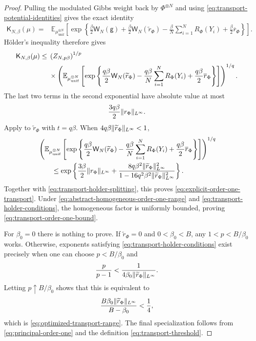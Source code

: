 \documentclass[11pt,reqno]{amsart}
\numberwithin{equation}{section}
\theoremstyle{plain}
\theoremstyle{definition}
\DeclarePairedDelimiter{\norm}{\lVert}{\rVert}
\newcommand{\E}{\mathbb E}
\newcommand{\be}{\beta}
\newcommand{\g}{\mathsf g}
\newcommand{\K}{\mathsf K}
\newcommand{\tl}{\widetilde}
\newcommand{\muunif}{\mu_{\mathrm{unif}}}
\begin{document}
\begin{proof}
Pulling the modulated Gibbs weight back by $\Phi^{\otimes N}$ and using \eqref{eq:transport-potential-identities} gives the exact identity
\begin{align}
 \K_{N,\be}(\mu)
 ={}&\E_{\muunif^{\otimes N}}\left[
 \exp\left\{\frac\be2\mathsf W_N(\g)
 +\frac\be2\mathsf W_N(\tl r_{\Phi})
 -\frac\be N\sum_{i=1}^NR_{\Phi}(Y_i)
 +\frac\be2\overline r_{\Phi}\right\}\right].
 \label{eq:transport-pullback-identity}
\end{align}
H\"older's inequality therefore gives
\begin{align}
 \K_{N,\be}(\mu)
 \leq{}&\left(Z_{N,p\be}\right)^{1/p}
 \notag\\
 &\times\left(\E_{\muunif^{\otimes N}}\left[
 \exp\left\{\frac{q\be}{2}\mathsf W_N(\tl r_{\Phi})
 -\frac{q\be}{N}\sum_{i=1}^NR_{\Phi}(Y_i)
 +\frac{q\be}{2}\overline r_{\Phi}\right\}\right]\right)^{1/q}.
 \label{eq:transport-holder-splitting}
\end{align}
The last two terms in the second exponential have absolute value at most
\begin{equation}
 \frac{3q\be}{2}\norm{r_{\Phi}}_{L^\infty}.
 \label{eq:transport-one-body-absolute-bound}
\end{equation}
Apply  to $\tl r_{\Phi}$ with $t=q\be$.  When $4q\be\norm{\tl r_{\Phi}}_{L^\infty}<1$,
\begin{align}
 &\left(\E_{\muunif^{\otimes N}}\left[
 \exp\left\{\frac{q\be}{2}\mathsf W_N(\tl r_{\Phi})
 -\frac{q\be}{N}\sum_{i=1}^NR_{\Phi}(Y_i)
 +\frac{q\be}{2}\overline r_{\Phi}\right\}\right]\right)^{1/q}
 \notag\\
 &\qquad\leq\exp\left\{
 \frac{3\be}{2}\norm{r_{\Phi}}_{L^\infty}
 +\frac{8q\be^2\norm{\tl r_{\Phi}}_{L^\infty}^2}
 {1-16q^2\be^2\norm{\tl r_{\Phi}}_{L^\infty}^2}
 \right\}.
 \label{eq:transport-remainder-bound}
\end{align}
Together with \eqref{eq:transport-holder-splitting}, this proves \eqref{eq:explicit-order-one-transport}. Under \eqref{eq:abstract-homogeneous-order-one-range} and \eqref{eq:transport-holder-conditions}, the homogeneous factor is uniformly bounded, proving \eqref{eq:transport-order-one-bound}.

For $\be_0=0$ there is nothing to prove. If $\tl r_{\Phi}=0$ and $0<\be_0<B$, any $1<p<B/\be_0$ works. Otherwise, exponents satisfying \eqref{eq:transport-holder-conditions} exist precisely when one can choose $p<B/\be_0$ and
\begin{equation}
 \frac{p}{p-1}
 <\frac{1}{4\be_0\norm{\tl r_{\Phi}}_{L^\infty}}.
 \label{eq:transport-optimization-conjugate}
\end{equation}
Letting $p\uparrow B/\be_0$ shows that this is equivalent to
\begin{equation}
 \frac{B\be_0\norm{\tl r_{\Phi}}_{L^\infty}}
 {B-\be_0}<\frac14,
 \label{eq:transport-optimization-algebra}
\end{equation}
which is \eqref{eq:optimized-transport-range}.  The final specialization follows from \eqref{eq:principal-order-one} and the definition \eqref{eq:transport-threshold}.
\end{proof}
\end{document}

